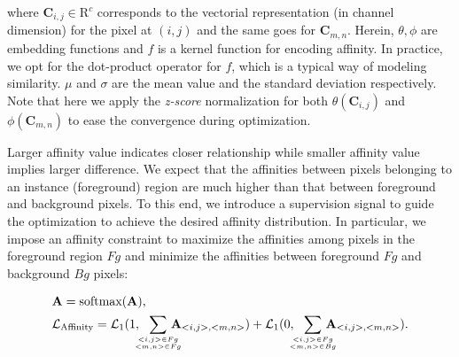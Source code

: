 \documentclass[runningheads]{llncs}
\begin{document}
\vspace{-4mm}\noindent
where $\mathbf{C}_{i,j}\in \mathrm{R}^c$ corresponds to the vectorial representation (in channel dimension) for the pixel at $(i,j)$ and the same goes for $\mathbf{C}_{m,n}$. Herein, $\theta, \phi$ are embedding functions and $f$ is a kernel function for encoding affinity. In practice, we opt for the dot-product operator for $f$, which is a typical way of modeling similarity. $\mu$ and $\sigma$ are the mean value and the standard deviation respectively. Note that here we apply the \emph{z-score} normalization for both $\theta(\mathbf{C}_{i,j})$ and $\phi(\mathbf{C}_{m,n})$ to ease the convergence during optimization. 


Larger affinity value indicates closer relationship while smaller affinity value implies larger difference. We expect that the affinities between pixels belonging to an instance (foreground) region are much higher than that between foreground and background pixels. To this end, we introduce a supervision signal to guide the optimization to achieve the desired affinity distribution. In particular, we impose an affinity constraint to maximize the affinities among pixels in the foreground region $Fg$ and minimize the affinities between foreground $Fg$ and background $Bg$ pixels:
\begin{small}
\begin{align}
\vspace{-5mm}
\begin{split}
& \mathbf{A} = \text{softmax} (\mathbf{A}),\\
& \mathcal{L}_{\text{Affinity}}= \mathcal{L}_{1}(1, \hspace{-5pt} \sum_{\begin{tiny}\begin{subarray}{c}<i,j>\in Fg\\ <m,n>\in Fg\end{subarray} \end{tiny}} \hspace{-10pt} \mathbf{A}_{<i,j>, <m,n>}) + \mathcal{L}_{1}(0, \hspace{-5pt} \sum_{\begin{tiny}\begin{subarray}{c}<i,j>\in Fg\\ <m,n>\in Bg\end{subarray}\end{tiny}} \hspace{-10pt} \mathbf{A}_{<i,j>, <m,n>}).
\end{split}
\end{align}
\end{small}
\end{document}
